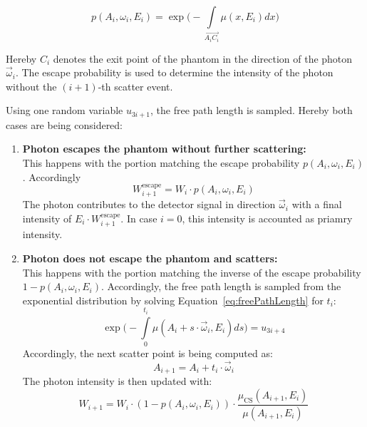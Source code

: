 \begin{equation}
    \label{eq:escapeProbability}
    p(A_i, \omega_i, E_i) = \exp\bigg(-\int\limits_{\overrightarrow{A_iC_i}} \mu(x, E_i) dx\bigg)
\end{equation}

Hereby $C_i$ denotes the exit point of the phantom in the direction of the photon $\vec{\omega}_i$. The escape probability is used to determine the intensity of the photon without the $(i+1)$-th scatter event.

Using one random variable $u_{3i+1}$, the free path length is sampled. Hereby both cases are being considered:

\begin{enumerate}
    \item \textbf{Photon escapes the phantom without further scattering:}\\
        This happens with the portion matching the escape probability $p(A_i,
        \omega_i, E_i)$. Accordingly 
        \begin{equation}
            W^{\text{escape}}_{i+1} = W_i \cdot p(A_i, \omega_i, E_i)
        \end{equation}
        The photon contributes to the detector signal in direction
        $\vec{\omega}_i$ with a final intensity of $E_i \cdot
        W^{\text{escape}}_{i+1}$. In case $i=0$, this intensity is accounted as
        priamry intensity.

    \item \textbf{Photon does not escape the phantom and scatters:}\\
        This happens with the portion matching the inverse of the escape
        probability $1 - p(A_i, \omega_i, E_i)$. Accordingly, the free path
        length is sampled from the exponential distribution by solving
        Equation~\ref{eq:freePathLength} for $t_i$:
        \begin{equation}
            \label{eq:freePathLength}
            \exp\bigg(-\int\limits_0^{t_i} \mu(A_{i} + s \cdot \vec{\omega}_
            {i}, E_{i}) ds\bigg) = u_{3i+4}
        \end{equation}
        Accordingly, the next scatter point is being computed as:
        \begin{equation}
            A_{i+1} = A_i + t_i \cdot \vec{\omega}_i
        \end{equation}
        The photon intensity is then updated with:
        \begin{equation}
            W_{i+1} = W_i \cdot (1 - p(A_i, \omega_i, E_i)) \cdot \frac{\mu_
            {\text{CS}}(A_{i+1}, E_i)}{\mu(A_{i+1}, E_i)}
        \end{equation}
\end{enumerate}


